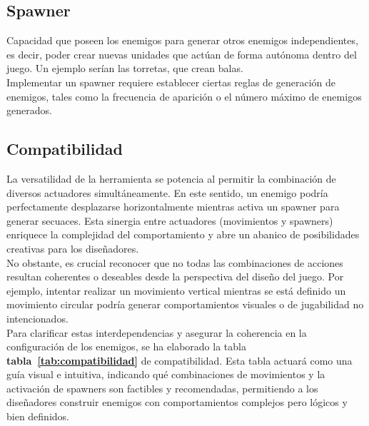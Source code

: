 \subsection{Spawner}
Capacidad que poseen los enemigos para generar otros enemigos independientes, es decir, poder crear nuevas unidades que actúan de forma autónoma dentro del juego. Un ejemplo serían las torretas, que crean balas.\\

Implementar un spawner requiere establecer ciertas reglas de generación de enemigos, tales como la frecuencia de aparición o el número máximo de enemigos generados.
\subsection{Compatibilidad}
La versatilidad de la herramienta se potencia al permitir la combinación de diversos actuadores simultáneamente. En este sentido, un enemigo podría perfectamente desplazarse horizontalmente mientras activa un spawner para generar secuaces. Esta sinergia entre actuadores (movimientos y spawners) enriquece la complejidad del comportamiento y abre un abanico de posibilidades creativas para los diseñadores.\\

No obstante, es crucial reconocer que no todas las combinaciones de acciones resultan coherentes o deseables desde la perspectiva del diseño del juego. Por ejemplo, intentar realizar un movimiento vertical mientras se está definido un movimiento circular podría generar comportamientos visuales o de jugabilidad no intencionados. \\

Para clarificar estas interdependencias y asegurar la coherencia en la configuración de los enemigos, se ha elaborado la tabla \textbf{tabla~\ref{tab:compatibilidad}} de compatibilidad. Esta tabla actuará como una guía visual e intuitiva, indicando qué combinaciones de movimientos y la activación de spawners son factibles y recomendadas, permitiendo a los diseñadores construir enemigos con comportamientos complejos pero lógicos y bien definidos.

